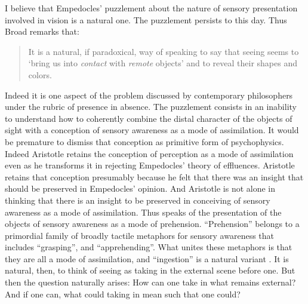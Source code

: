 \documentclass[12pt]{article}
\begin{document}
I believe that Empedocles' puzzlement about the nature of sensory presentation involved in vision is a natural one. The puzzlement persists to this day. Thus Broad remarks that:
\begin{quote}
    It is a natural, if paradoxical, way of speaking to say that seeing seems to `bring us into \emph{contact} with \emph{remote} objects' and to reveal their shapes and colors. \citep[33]{Broad:1952kx}
\end{quote}
Indeed it is one aspect of the problem discussed by contemporary philosophers under the rubric of presence in absence. The puzzlement consists in an inability to understand how to coherently combine the distal character of the objects of sight with a conception of sensory awareness as a mode of assimilation. It would be premature to dismiss that conception as primitive form of psychophysics. Indeed Aristotle retains the conception of perception as a mode of assimilation even as he transforms it in rejecting Empedocles' theory of effluences. Aristotle retains that conception presumably because he felt that there was an insight that should be preserved in Empedocles' opinion. And Aristotle is not alone in thinking that there is an insight to be preserved in conceiving of sensory awareness as a mode of assimilation. Thus \citet{Broad:1952kx} speaks of the presentation of the objects of sensory awareness as a mode of prehension.  ``Prehension'' belongs to a primordial family of broadly tactile metaphors for sensory awareness that includes ``grasping'', and ``apprehending''. What unites these metaphors is that they are all a mode of assimilation, and ``ingestion'' is a natural variant \citep[see][7]{Johnston:2006uq,Price:1932fk}. It is natural, then, to think of seeing as taking in the external scene before one.  But then the question naturally arises: How can one take in what remains external? And if one can, what could taking in mean such that one could?
\end{document}
